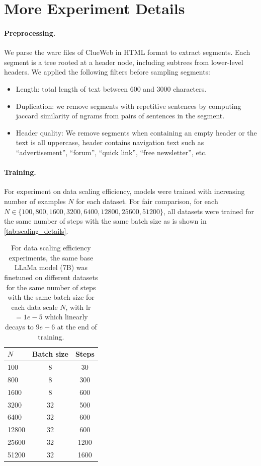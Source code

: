 \section{More Experiment Details}
\paragraph{Preprocessing.} We parse the warc files of ClueWeb in HTML format to extract segments. Each segment is a tree rooted at a header node, including subtrees from lower-level headers. We applied the following filters before sampling segments: 
\begin{itemize}
    \item Length: total length of text between 600 and 3000 characters.
    \item Duplication: we remove segments with repetitive sentences by computing jaccard similarity of ngrams from pairs of sentences in the segment.
    \item Header quality: We remove segments when containing an empty header or the text is all uppercase, header contains navigation text such as “advertisement”, “forum”, “quick link”, “free newsletter”, etc.
\end{itemize}
  
\paragraph{Training.} For experiment on data scaling efficiency, models were trained with increasing number of examples $N$ for each dataset. For fair comparison, for each $N \in \{100, 800, 1600, 3200, 6400, 12800, 25600, 51200\}$, all datasets were trained for the same number of steps with the same batch size as is shown in \autoref{tab:scaling_details}.

\begin{table}[h]
      \caption{For data scaling efficiency experiments, the same base LLaMa model (7B) was finetuned on different datasets for the same number of steps with the same batch size for each data scale $N$, with lr$=1e-5$ which linearly decays to $9e-6$ at the end of training.
      \label{tab:scaling_details}
      }
  \centering
  \begin{tabular}{lcc}
    \toprule
      $N$   &  Batch size & Steps \\
    \midrule
100 & 8 & 30  \\
800 & 8 & 300 \\
1600 & 8 & 600 \\
3200 & 32 & 500 \\
6400 & 32 & 600 \\
12800 & 32 & 600 \\
25600 & 32 & 1200 \\
51200 & 32 & 1600 \\
    \bottomrule
  \end{tabular}

\end{table}

